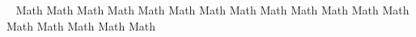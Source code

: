 \documentclass[12pt,a4paper]{article}
\begin{document}
\ \vskip8cm
Math Math Math Math Math Math Math Math Math Math Math Math Math Math Math Math Math Math 
\end{document}
